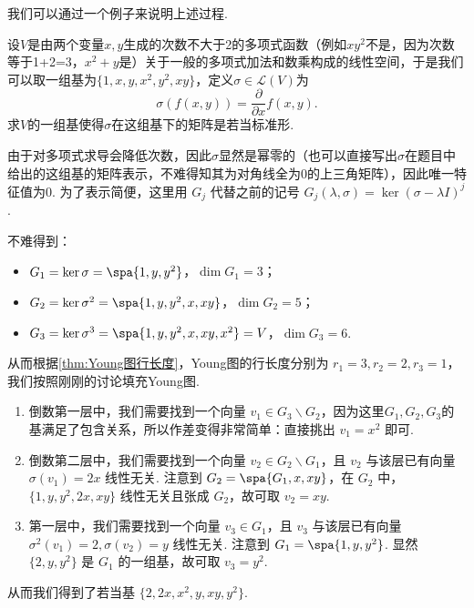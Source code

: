 我们可以通过一个例子来说明上述过程.
\begin{example}{}{}
    设$V$是由两个变量$x,y$生成的次数不大于2的多项式函数（例如$xy^2$不是，因为次数等于1+2=3，$x^2+y$是）关于一般的多项式加法和数乘构成的线性空间，于是我们可以取一组基为$\{1,x,y,x^2,y^2,xy\}$，定义$\sigma\in \mathcal{L}(V)$为
    \[\sigma(f(x,y))=\dfrac{\partial}{\partial x}f(x,y).\]
    求$V$的一组基使得$\sigma$在这组基下的矩阵是若当标准形.
\end{example}
\begin{solution}
    由于对多项式求导会降低次数，因此$\sigma$显然是幂零的（也可以直接写出$\sigma$在题目中给出的这组基的矩阵表示，不难得知其为对角线全为$0$的上三角矩阵），因此唯一特征值为$0$. 为了表示简便，这里用 $G_j$ 代替之前的记号 $G_j(\lambda,\sigma)=\ker (\sigma-\lambda I)^j$.

    不难得到：
    \begin{itemize}
        \item $G_1 = \ker \sigma = \spa\{1, y, y^2\}$，$\dim G_1 = 3$；
        \item $G_2 = \ker \sigma^2 = \spa\{1, y, y^2, x, xy\}$，$\dim G_2 = 5$；
        \item $G_3 = \ker \sigma^3 = \spa\{1, y, y^2, x, xy, x^2\} = V$，$\dim G_3 = 6$.
    \end{itemize}

    从而根据\autoref{thm:Young图行长度}，Young图的行长度分别为 $r_1 = 3, r_2 = 2, r_3 = 1$，我们按照刚刚的讨论填充Young图.

    \begin{enumerate}
        \item 倒数第一层中，我们需要找到一个向量 $v_1 \in G_3 \backslash G_2$，因为这里$G_1, G_2, G_3$的基满足了包含关系，所以作差变得非常简单：直接挑出 $v_1=x^2$ 即可.
        \item 倒数第二层中，我们需要找到一个向量 $v_2 \in G_2 \backslash G_1$，且 $v_2$ 与该层已有向量 $\sigma(v_1)=2x$ 线性无关. 注意到 $G_2 = \spa\{G_1, x, xy\}$，在 $G_2$ 中，$\{1, y, y^2, 2x, xy\}$ 线性无关且张成 $G_2$，故可取 $v_2 = xy$.
        \item 第一层中，我们需要找到一个向量 $v_3 \in G_1$，且 $v_3$ 与该层已有向量 $\sigma^2(v_1)=2, \sigma(v_2)=y$ 线性无关. 注意到 $G_1 = \spa\{1, y, y^2\}$. 显然 $\{2, y, y^2\}$ 是 $G_1$ 的一组基，故可取 $v_3 = y^2$.
    \end{enumerate}

    从而我们得到了若当基 $\{2, 2x, x^2, y, xy, y^2\}$.
\end{solution}


